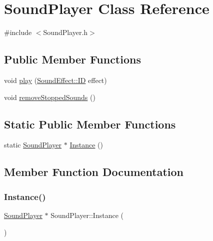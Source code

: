 \hypertarget{class_sound_player}{}\section{Sound\+Player Class Reference}
\label{class_sound_player}


{\ttfamily \#include $<$Sound\+Player.\+h$>$}

\subsection*{Public Member Functions}
\begin{DoxyCompactItemize}
\item 
void \hyperlink{class_sound_player_aa0b85f15f5b13bc41c71eeee6b0a7779}{play} (\hyperlink{namespace_sound_effect_a11ffbf1eb89e85a34cbfd5a59b2cd9cb}{Sound\+Effect\+::\+ID} effect)
\item 
void \hyperlink{class_sound_player_a3fd165dadf60b580b16367b81d84681b}{remove\+Stopped\+Sounds} ()
\end{DoxyCompactItemize}
\subsection*{Static Public Member Functions}
\begin{DoxyCompactItemize}
\item 
static \hyperlink{class_sound_player}{Sound\+Player} $\ast$ \hyperlink{class_sound_player_a4458c33c6054f60a9cd70cdbb2d1cdb0}{Instance} ()
\end{DoxyCompactItemize}


\subsection{Member Function Documentation}
\mbox{\label{class_sound_player_a4458c33c6054f60a9cd70cdbb2d1cdb0}} 
\subsubsection{\texorpdfstring{Instance()}{Instance()}}
{\footnotesize\ttfamily \hyperlink{class_sound_player}{Sound\+Player} $\ast$ Sound\+Player\+::\+Instance (\begin{DoxyParamCaption}{ }\end{DoxyParamCaption})\hspace{0.3cm}{\ttfamily [static]}}

